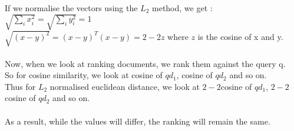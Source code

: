 \documentclass{article}
\begin{document}
If we normalise the vectors using the $L_2$ method, we get : $\sqrt{\sum_i x^{2}_{i}} = \sqrt{\sum_i y^{2}_{i}} = 1$\\
$\sqrt{(x-y)^2} = (x-y)^T (x-y) = 2 - 2z$ where $z$ is the cosine of x and y.\\\\
Now, when we look at ranking documents, we rank them against the query q.\\
So for cosine similarity, we look at cosine of $qd_1$, cosine of $qd_2$ and so on.\\
Thus for $L_2$ normalised euclidean distance, we look at $2 - 2$cosine of $qd_1$, $2 - 2$cosine of $qd_2$ and so on.\\\\
As a result, while the values will differ, the ranking will remain the same.
\end{document}
